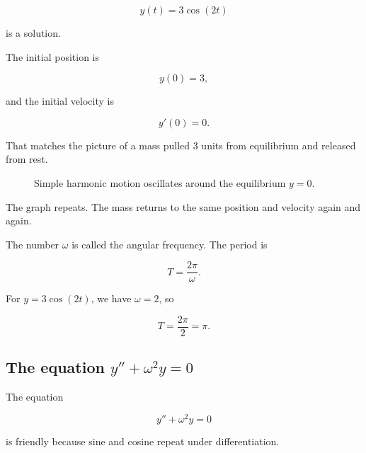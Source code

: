 \[
\boxed{
y(t)=3\cos(2t)
}
\]

is a solution.

The initial position is

\[
y(0)=3,
\]

and the initial velocity is

\[
y'(0)=0.
\]

That matches the picture of a mass pulled \(3\) units from equilibrium and released
from rest.

\begin{figure}[h]
\centering
{}
\caption{Simple harmonic motion oscillates around the equilibrium \(y=0\).}
\label{fig:simple-harmonic-motion-cos}
\end{figure}

The graph repeats.  The mass returns to the same position and velocity again and again.

The number \(\omega\) is called the angular frequency.  The period is

\[
\boxed{
T=\frac{2\pi}{\omega}.
}
\]

For \(y=3\cos(2t)\), we have \(\omega=2\), so

\[
T=\frac{2\pi}{2}=\pi.
\]

\subsection{\texorpdfstring{The equation \(y''+\omega^2y=0\)}{The equation y'' + omega^2 y = 0}}
\label{subsec:equation-ypp-omega2-y}

The equation

\[
y''+\omega^2y=0
\]

is friendly because sine and cosine repeat under differentiation.

